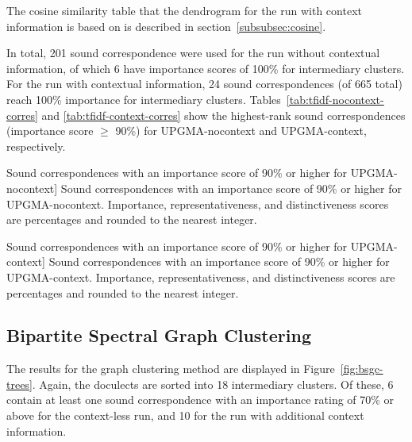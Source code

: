\documentclass[a4paper]{article}
\begin{document}
The cosine similarity table that the dendrogram
for the run with context information is based on
is described in section~\ref{subsubsec:cosine}.

In total, 201 sound correspondence were used for the run without contextual information,
of which 6 have importance scores of 100\% for intermediary clusters.
For the run with contextual information,
24 sound correspondences (of 665 total) reach 100\% importance for intermediary clusters.
Tables~\ref{tab:tfidf-nocontext-corres} and \ref{tab:tfidf-context-corres}
show the highest-rank sound correspondences (importance score $\geq$ 90\%)
for UPGMA-nocontext and UPGMA-context, respectively.

\begin{table}[h]
\begin{adjustwidth}{-1cm}{-1cm}
\centering

\end{adjustwidth}
\caption
[Sound correspondences with an importance score of 90\% or higher for UPGMA-nocontext]
{Sound correspondences with an importance score of 90\% or higher for UPGMA-nocontext.
Importance, representativeness, and distinctiveness scores are percentages
and rounded to the nearest integer.
}
\label{tab:tfidf-nocontext-corres}
\end{table}

\begin{table}[h]
\begin{adjustwidth}{-1cm}{-1cm}
\centering

\end{adjustwidth}
\caption
[Sound correspondences with an importance score of 90\% or higher for UPGMA-context]
{Sound correspondences with an importance score of 90\% or higher for UPGMA-context.
Importance, representativeness, and distinctiveness scores are percentages
and rounded to the nearest integer.
}
\label{tab:tfidf-context-corres}
\end{table}
\FloatBarrier

\subsection{Bipartite Spectral Graph Clustering}

The results for the graph clustering method are
displayed in Figure~\ref{fig:bsgc-trees}.
Again, the doculects are sorted into 18 intermediary clusters.
Of these, 6 contain at least one sound correspondence
with an importance rating of 70\% or above for the context-less run,
and 10 for the run with additional context information.
\end{document}

